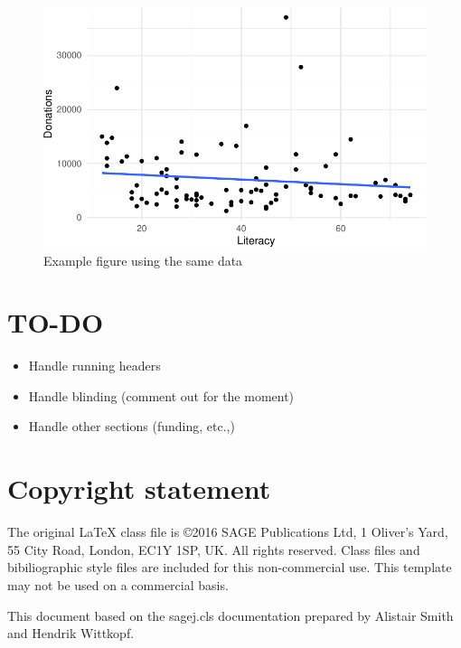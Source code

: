 \documentclass[
  Afour,
  times,
  sageh]{sagej}
\providecommand{\tightlist}{%
  \setlength{\itemsep}{0pt}\setlength{\parskip}{0pt}}
\begin{document}
\begin{figure}

{\centering \includegraphics{template_files/figure-pdf/fig-literacy-1.pdf}

}

\caption{\label{fig-literacy}Example figure using the same data}

\end{figure}

\hypertarget{to-do}{%
\section{TO-DO}\label{to-do}}

\begin{itemize}
\tightlist
\item
  Handle running headers
\item
  Handle blinding (comment out for the moment)
\item
  Handle other sections (funding, etc.,)
\end{itemize}

\hypertarget{copyright-statement}{%
\section{Copyright statement}\label{copyright-statement}}

The original \LaTeX{} class file is \copyright 2016 SAGE Publications
Ltd, 1 Oliver's Yard, 55 City Road, London, EC1Y 1SP, UK. All rights
reserved. Class files and bibiliographic style files are included for
this non-commercial use. This template may not be used on a commercial
basis.

\renewcommand\refname{References}



\begin{acks}
  This document based on the sagej.cls documentation prepared by
  Alistair Smith and Hendrik Wittkopf.
\end{acks}
\end{document}
